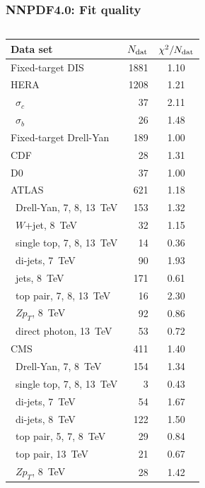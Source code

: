 \documentclass{beamer}
\begin{document}
\begin{frame}
 \frametitle{NNPDF4.0: Fit quality}
 \footnotesize
 \centering
 \begin{columns}[c]
  \begin{column}{0.5\textwidth}
  \tiny
  \renewcommand*{\arraystretch}{1.1}
   \begin{tabularx}{\columnwidth}{Xrc}
   \toprule
   Data set                   & $N_{\rm dat}$ & $\chi^2/N_{\rm dat}$ \\
   \midrule
   Fixed-target DIS           & 1881 & 1.10 \\
   HERA                       & 1208 & 1.21 \\
   \ $\sigma_c$               &   37 & 2.11 \\
   \ $\sigma_b$               &   26 & 1.48 \\
   Fixed-target Drell-Yan     &  189 & 1.00 \\
   CDF                        &   28 & 1.31 \\
   D0                         &   37 & 1.00 \\
   ATLAS                      &  621 & 1.18 \\
   \ Drell-Yan, 7, 8, 13~TeV  &  153 & 1.32 \\
   \ $W$+jet, 8~TeV           &   32 & 1.15 \\
   \ single top, 7, 8, 13~TeV &   14 & 0.36 \\
   \ di-jets, 7~TeV           &   90 & 1.93 \\
   \ jets, 8~TeV              &  171 & 0.61 \\
   \ top pair, 7, 8, 13~TeV   &   16 & 2.30 \\
   \ $Zp_T$, 8~TeV            &   92 & 0.86 \\
   \ direct photon, 13~TeV    &   53 & 0.72 \\
   CMS                        &  411 & 1.40 \\
   \ Drell-Yan, 7, 8~TeV      &  154 & 1.34 \\
   \ single top, 7, 8, 13~TeV &    3 & 0.43 \\
   \ di-jets, 7~TeV           &   54 & 1.67 \\
   \ di-jets, 8~TeV           &  122 & 1.50 \\
   \ top pair, 5, 7, 8~TeV    &   29 & 0.84 \\
   \ top pair, 13~TeV         &   21 & 0.67 \\
   \ $Zp_T$, 8~TeV            &   28 & 1.42 \\

\end{tabularx}
\end{column}
\end{columns}
\end{frame}
\end{document}
